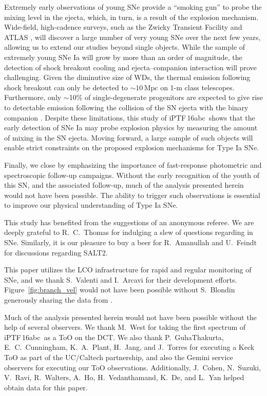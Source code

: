 \documentclass[twocolumn]{aastex61}
\newcommand{\abc}{iPTF\,16abc}
\begin{document}
Extremely early observations of young SNe provide a ``smoking
gun'' to probe the mixing level in the ejecta, which, in turn, is 
a result of the explosion mechanism. Wide-field, high-cadence surveys, such as the Zwicky Transient Facility \citep{2016PASP..128h4501B} and ATLAS \citep{2011PASP..123...58T,2013RSPTA.37120269T}, will discover a large number of very young SNe over the next few years, allowing us to extend our studies beyond single objects. While the sample of extremely young SNe Ia will grow by more than an order of magnitude, the detection of shock breakout cooling and ejecta--companion interaction will prove challenging. Given the diminutive size of WDs, the thermal emission following shock breakout can only be detected to $\sim 10\,\mathrm{Mpc}$ on 1-m class telescopes. Furthermore, only $\sim$10\% of single-degenerate progenitors are expected to give rise to detectable emission following the collision of the SN ejecta with the binary companion \citep{2010ApJ...708.1025K}. Despite these limitations, this study of \abc\ shows that the early detection of SNe Ia may probe explosion physics by measuring the amount of mixing in the SN ejecta. Moving forward, a large sample of such objects will enable strict constraints on the proposed explosion mechanisms for Type Ia SNe.

Finally, we close by emphasizing the importance of fast-response photometric and spectroscopic follow-up campaigns. Without the early recognition of the youth of this SN, and the associated follow-up, much of the analysis presented herein would not have been possible. The ability to trigger such observations is essential to improve our physical understanding of Type Ia SNe.

\acknowledgements

This study has benefited from the suggestions of an anonymous
referee. We are deeply grateful to R.~C.~Thomas for indulging a slew of
questions regarding  in SNe. Similarly, it is our pleasure to buy a
beer for R.~Amanullah and U.~Feindt for discussions regarding SALT2.

This paper utilizes the LCO infrastructure for rapid and regular monitoring of
SNe, and we thank S.~Valenti and I.~Arcavi for their development efforts.
Figure~\ref{fig:branch_vel} would not have been possible without
S.~Blondin generously sharing the data from \citet{2012AJ....143..126B}.

Much of the analysis presented herein would not have been possible without the
help of several observers. We thank M.~West for taking the first spectrum of
\abc\ as a ToO on the DCT. We also thank P.~GuhaThakurta, E.~C.~Cunningham,
K.~A.~Plant, H.~Jang, and J.~Torres for executing a Keck ToO as part of the
UC/Caltech partnership, and also the Gemini service observers for executing
our ToO observations. Additionally, J.~Cohen, N.~Suzuki, V.~Ravi, R.~Walters,
A.~Ho, H.~Vedanthamand, K.~De, and L.~Yan helped obtain data for this paper.
\end{document}
